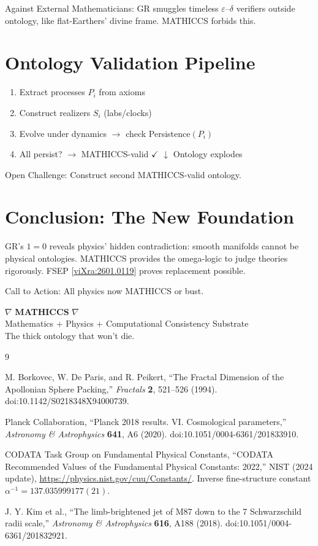 \documentclass[11pt,a4paper]{article}
\begin{document}
Against External Mathematicians: GR smuggles timeless $\varepsilon$--$\delta$ verifiers outside ontology, like flat-Earthers' divine frame. MATHICCS forbids this.

\section{Ontology Validation Pipeline}
\begin{enumerate}
\item Extract processes $P_i$ from axioms
\item Construct realizers $S_i$ (labs/clocks)
\item Evolve under dynamics $\to$ check Persistence$(P_i)$
\item All persist? $\to$ MATHICCS-valid $\checkmark$ $\downarrow$ Ontology explodes
\end{enumerate}
Open Challenge: Construct second MATHICCS-valid ontology.

\section{Conclusion: The New Foundation}
GR's $1=0$ reveals physics' hidden contradiction: smooth manifolds cannot be physical ontologies. MATHICCS provides the omega-logic to judge theories rigorously. FSEP [\href{https://vixra.org/abs/2601.0119}{viXra:2601.0119}] proves replacement possible.

Call to Action: All physics now MATHICCS or bust.

\vspace{2em}
\centering
$\nabla$ \textbf{MATHICCS} $\nabla$ \\
Mathematics + Physics + Computational Consistency Substrate \\
The thick ontology that won't die.

\begin{thebibliography}{9}

M. Borkovec, W. De Paris, and R. Peikert,
``The Fractal Dimension of the Apollonian Sphere Packing,''
\emph{Fractals} \textbf{2}, 521--526 (1994).
doi:10.1142/S0218348X94000739.

Planck Collaboration,
``Planck 2018 results. VI. Cosmological parameters,''
\emph{Astronomy \& Astrophysics} \textbf{641}, A6 (2020).
doi:10.1051/0004-6361/201833910.

CODATA Task Group on Fundamental Physical Constants,
``CODATA Recommended Values of the Fundamental Physical Constants: 2022,''
NIST (2024 update), \url{https://physics.nist.gov/cuu/Constants/}.
Inverse fine-structure constant $\alpha^{-1} = 137.035999177(21)$.

J. Y. Kim et al.,
``The limb-brightened jet of M87 down to the 7 Schwarzschild radii scale,''
\emph{Astronomy \& Astrophysics} \textbf{616}, A188 (2018).
doi:10.1051/0004-6361/201832921.

\end{thebibliography}
\end{document}
